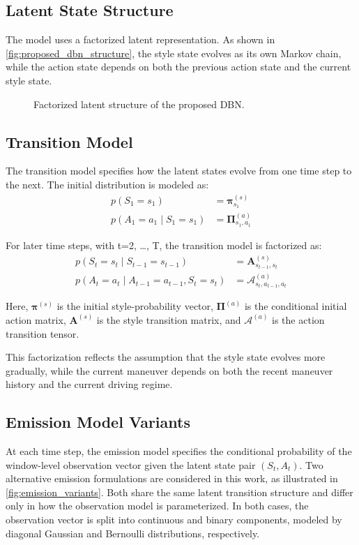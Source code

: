 \subsection{Latent State Structure}
\label{subsec:latent_state_structure}
The model uses a factorized latent representation. 
As shown in \autoref{fig:proposed_dbn_structure}, the style state evolves as its own Markov chain, while the action state 
depends on both the previous action state and the current style state.
\begin{figure}[htbp]
    \centering
    
    \caption{Factorized latent structure of the proposed DBN.}
    \label{fig:proposed_dbn_structure}
\end{figure}

\subsection{Transition Model}
\label{subsec:transition_model}
The transition model specifies how the latent states evolve from one time step to the next.
The initial distribution is modeled as:
\begin{align}
p(S_1 = s_1) &= \bm{\pi}^{(s)}_{s_1} \\
p(A_1 = a_1 \mid S_1 = s_1) &= \bm{\Pi}^{(a)}_{s_1, a_1}
\end{align}

For later time steps, with t=2, \dots, T, the transition model is factorized as:
\begin{align}
p(S_t = s_t \mid S_{t-1} = s_{t-1}) &= \bm{A}^{(s)}_{s_{t-1}, s_t}\\
p(A_t = a_t \mid A_{t-1} = a_{t-1}, S_t = s_t) &= \mathcal{A}^{(a)}_{s_t, a_{t-1}, a_t}
\end{align}

Here, $\bm{\pi}^{(s)}$ is the initial style-probability vector, $\bm{\Pi}^{(a)}$ is the conditional initial action matrix, $\bm{A}^{(s)}$ is the style transition matrix, and $\mathcal{A}^{(a)}$ is the action transition tensor.

This factorization reflects the assumption that the style state evolves more gradually, 
while the current maneuver depends on both the recent maneuver history and the current driving regime. 


\subsection{Emission Model Variants}
\label{subsec:emission_model_variants}
At each time step, the emission model specifies the conditional probability of the window-level observation vector given the latent state pair \((S_t, A_t)\).  
Two alternative emission formulations are considered in this work, as illustrated in \autoref{fig:emission_variants}. 
Both share the same latent transition structure and differ only in how the observation model is parameterized.   
In both cases, the observation vector is split into continuous and binary components, modeled by diagonal Gaussian and Bernoulli distributions, respectively.


